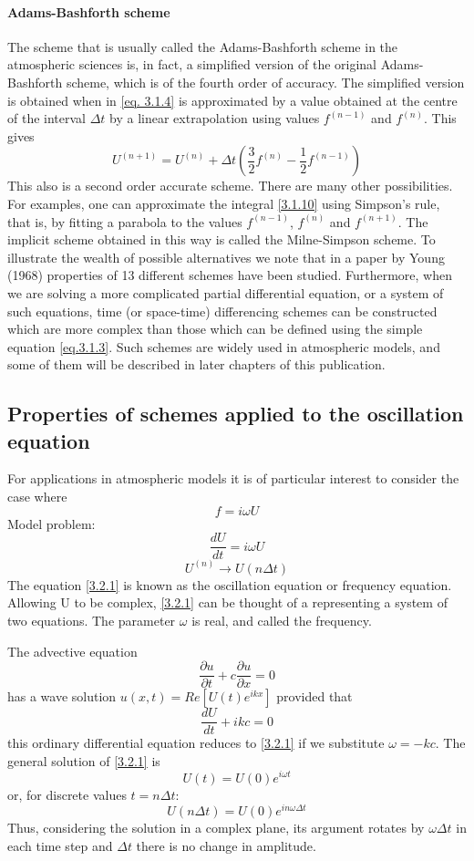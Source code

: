 \paragraph{Adams-Bashforth scheme}
The scheme that is usually called the Adams-Bashforth scheme in the atmospheric sciences is, in fact, a simplified version of the original Adams-Bashforth scheme, which is of the fourth order of accuracy. The simplified version is obtained when
in \ref{eq. 3.1.4} is approximated by a value obtained at the centre of the interval $\Delta t$ by a linear extrapolation using values $f^{(n-1)}$ and $f^{(n)}$. This gives
\begin{equation}\label{3.1.12}
	U^{(n+1)}=U^{(n)}+\Delta t\left(\frac{3}{2}f^{(n)}-\frac{1}{2}f^{(n-1)}\right)
\end{equation}
This also is a second order accurate scheme.
There are many other possibilities. For examples, one can approximate the integral \ref{3.1.10} using Simpson's rule, that is, by fitting a parabola to the values $f^{(n-1)}$, $f^{(n)}$ and $f^{(n+1)}$.
The implicit scheme obtained in this way is called the Milne-Simpson scheme. To illustrate the wealth of possible alternatives we note that in a paper by Young (1968) properties of 13 different schemes have been studied. Furthermore, when we are solving a more complicated partial differential equation, or a system of such equations, time (or space-time) differencing schemes can be constructed which are more complex than those which can be defined using the simple equation \ref{eq.3.1.3}. Such schemes are widely used in atmospheric models, and some of them will be described in later chapters of this publication.


\subsection{Properties of schemes applied to the oscillation equation}
For applications in atmospheric models it is of particular interest to consider the case where $$f=i\omega U$$
Model problem:
\begin{equation}\label{3.2.1}
	\frac{dU}{dt}=i\omega U
\end{equation}
$$U^{(n)}\rightarrow U(n\Delta t)$$
The equation \ref{3.2.1} is known as the oscillation equation or frequency equation. Allowing U to be complex, \ref{3.2.1} can be thought of a representing a system of two equations. The parameter $\omega$ is real, and called the frequency.

The advective equation $$\frac{\partial u}{\partial t}+c\frac{\partial u}{\partial x}=0$$
has a wave solution $u(x,t)=Re[U(t)e^{ikx}]$ provided that
$$\frac{dU}{dt}+ikc=0$$
this ordinary differential equation reduces to \ref{3.2.1} if we substitute $\omega=-kc$.
The general solution of \ref{3.2.1} is
$$U(t)=U(0)e^{i\omega t}$$
or, for discrete values $t=n\Delta t$:
\begin{equation}
	U(n\Delta t)=U(0)e^{in\omega\Delta t}
\end{equation}
Thus, considering the solution in a complex plane, its argument rotates by $\omega\Delta t$ in each time step and $\Delta t$ there is no change in amplitude.

